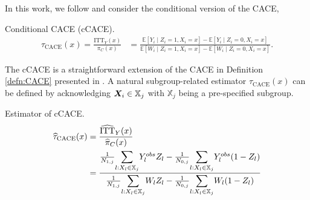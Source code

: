 In this work, we follow \cite{bargagli-stoffi_heterogeneous_2022} and consider the conditional version of the CACE, 

\begin{defn}{Conditional CACE (cCACE).}
   \begin{align*}
      \tau_{\text{CACE}}(x) = \frac{\text{ITT}_{Y}(x)}{\pi_C(x)} &= \frac{\mathbb{E}[Y_i \mid Z_i = 1, X_i = x] - \mathbb{E}[Y_i \mid Z_i = 0, X_i = x]}{\mathbb{E}[W_i \mid Z_i = 1, X_i = x] - \mathbb{E}[W_i \mid Z_i = 0, X_i = x]}.
   \end{align*}
\end{defn}

The cCACE is a straightforward extension of the CACE in Definition \ref{defn:CACE} presented in \cite{bargagli-stoffi_heterogeneous_2022}. A natural subgroup-related estimator $\tau_{\text{CACE}}(x)$ can be defined by acknowledging $\bm X_i \in \mathbb{X}_j$ with $\mathbb{X}_j$ being a pre-specified subgroup.

\begin{defn}{Estimator of cCACE.}
   \label{defn:cCACE_estimator}
   \begin{align*}
      \widehat\tau_{\text{CACE}}(x) &= \frac{\widehat{\text{ITT}}_{Y}(x)}{\widehat{\pi}_C(x)} \\
      &= \frac{\frac{1}{N_{1,j}} \mathlarger{\sum}_{l: X_l \in \mathbb{X}_j} Y^{obs}_l Z_l - \frac{1}{N_{0,j}} \mathlarger{\sum}_{l: X_l \in \mathbb{X}_j} Y^{obs}_l (1 - Z_l)}{\frac{1}{N_{1,j}} \mathlarger{\sum}_{l: X_l \in \mathbb{X}_j} W_l Z_l - \frac{1}{N_{0,j}} \mathlarger{\sum}_{l: X_l \in \mathbb{X}_j} W_l (1 - Z_l)
      }\\
   \end{align*}
\end{defn}

